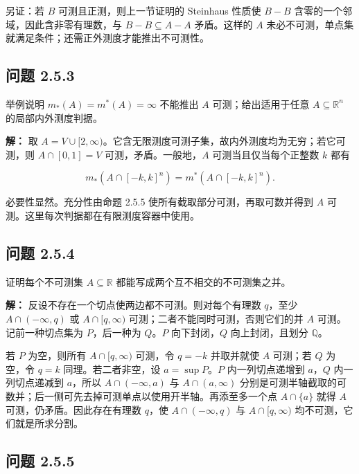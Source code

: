\documentclass[11pt,a4paper]{article}
\begin{document}
另证：若 \(B\) 可测且正测，则上一节证明的 Steinhaus 性质使 \(B-B\)
含零的一个邻域，因此含非零有理数，与 \(B-B\subseteq A-A\) 矛盾。这样的
\(A\) 未必不可测，单点集就满足条件；还需正外测度才能推出不可测性。

\subsection{问题 2.5.3}\label{ux95eeux9898-2.5.3}

举例说明 \(m_*(A)=m^*(A)=\infty\) 不能推出 \(A\) 可测；给出适用于任意
\(A\subseteq\mathbb R^n\) 的局部内外测度判据。

\textbf{解：} 取
\(A=V\cup[2,\infty)\)。它含无限测度可测子集，故内外测度均为无穷；若它可测，则
\(A\cap[0,1]=V\) 可测，矛盾。一般地，\(A\) 可测当且仅当每个正整数 \(k\)
都有

\begin{equation*}
m_*(A\cap[-k,k]^n)=m^*(A\cap[-k,k]^n).
\end{equation*}

必要性显然。充分性由命题 2.5.5 使所有截取部分可测，再取可数并得到 \(A\)
可测。这里每次判据都在有限测度容器中使用。

\subsection{问题 2.5.4}\label{ux95eeux9898-2.5.4}

证明每个不可测集 \(A\subseteq\mathbb R\)
都能写成两个互不相交的不可测集之并。

\textbf{解：} 反设不存在一个切点使两边都不可测。则对每个有理数
\(q\)，至少 \(A\cap(-\infty,q)\) 或 \(A\cap[q,\infty)\)
可测；二者不能同时可测，否则它们的并 \(A\) 可测。记前一种切点集为
\(P\)，后一种为 \(Q\)。\(P\) 向下封闭，\(Q\) 向上封闭，且划分
\(\mathbb Q\)。

若 \(P\) 为空，则所有 \(A\cap[q,\infty)\) 可测，令 \(q=-k\) 并取并就使
\(A\) 可测；若 \(Q\) 为空，令 \(q=k\) 同理。若二者非空，设
\(a=\sup P\)。\(P\) 内一列切点递增到 \(a\)，\(Q\) 内一列切点递减到
\(a\)，所以 \(A\cap(-\infty,a)\) 与 \(A\cap(a,\infty)\)
分别是可测半轴截取的可数并；后一侧可先去掉可测单点以使用开半轴。再添至多一个点
\(A\cap\{a\}\) 就得 \(A\) 可测，仍矛盾。因此存在有理数 \(q\)，使
\(A\cap(-\infty,q)\) 与 \(A\cap[q,\infty)\) 均不可测，它们就是所求分割。

\subsection{问题 2.5.5}\label{ux95eeux9898-2.5.5}
\end{document}

